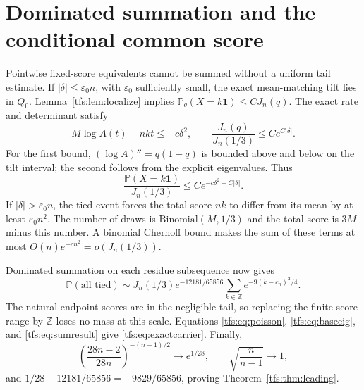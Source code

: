 \documentclass[11pt,a4paper]{article}
\numberwithin{equation}{section}
\theoremstyle{remark}
\newcommand{\Prob}{\mathbb P}
\newcommand{\Z}{\mathbb Z}
\newcommand{\1}{\mathbf 1}
\begin{document}
\section{Dominated summation and the conditional common score}\label{tfs:sec:summation}
Pointwise fixed-score equivalents cannot be summed without a uniform
tail estimate. If $|\delta|\leq\varepsilon_0 n$, with $\varepsilon_0$
sufficiently small, the exact mean-matching tilt lies in $Q_0$.
Lemma~\ref{tfs:lem:localize} implies $\Prob_q(X=k\1)\leq C J_n(q)$.
The exact rate and determinant satisfy
\[
M\log A(t)-nkt\leq-c\delta^2,\qquad
\frac{J_n(q)}{J_n(1/3)}\leq C e^{C|\delta|}.
\]
For the first bound, $(\log A)''=q(1-q)$ is bounded above and below on
the tilt interval; the second follows from the explicit eigenvalues.
Thus
\begin{equation}\label{tfs:eq:majorant}
\frac{\Prob(X=k\1)}{J_n(1/3)}\leq
                         C e^{-c\delta^2+C|\delta|}.
\end{equation}
If $|\delta|>\varepsilon_0 n$, the tied event forces the total score
$nk$ to differ from its mean by at least $\varepsilon_0 n^2$.
The number of draws is $\mathrm{Binomial}(M,1/3)$ and the total score is
$3M$ minus this number. A binomial Chernoff bound makes the sum of these
terms at most $O(n)e^{-cn^2}=o(J_n(1/3))$.

Dominated summation on each residue subsequence now gives
\begin{equation}\label{tfs:eq:sumresult}
\Prob(\text{all tied})\sim J_n(1/3)e^{-12181/65856}
                              \sum_{k\in\Z}e^{-9(k-c_n)^2/4}.
\end{equation}
The natural endpoint scores are in the negligible tail, so replacing the
finite score range by $\Z$ loses no mass at this scale. Equations
\eqref{tfs:eq:poisson}, \eqref{tfs:eq:baseeig}, and \eqref{tfs:eq:sumresult} give
\eqref{tfs:eq:exactcarrier}. Finally,
\[
\left(\frac{28n-2}{28n}\right)^{-(n-1)/2}\longrightarrow e^{1/28},
\qquad \sqrt{\frac n{n-1}}\longrightarrow1,
\]
and $1/28-12181/65856=-9829/65856$, proving
Theorem~\ref{tfs:thm:leading}.
\end{document}
